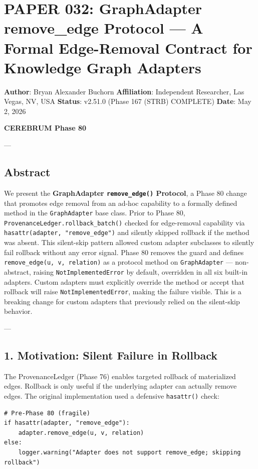 \section{PAPER 032: GraphAdapter remove\_edge Protocol — A Formal Edge-Removal Contract for Knowledge Graph Adapters}

\textbf{Author}: Bryan Alexander Buchorn  
\textbf{Affiliation}: Independent Researcher, Las Vegas, NV, USA  
\textbf{Status}: v2.51.0 (Phase 167 (STRB) COMPLETE)
\textbf{Date}: May 2, 2026

\textbf{CEREBRUM Phase 80}

---

\subsection{Abstract}

We present the \textbf{GraphAdapter \texttt{remove\_edge()} Protocol}, a Phase 80 change that promotes edge removal from an ad-hoc capability to a formally defined method in the \texttt{GraphAdapter} base class. Prior to Phase 80, \texttt{ProvenanceLedger.rollback\_batch()} checked for edge-removal capability via \texttt{hasattr(adapter, "remove\_edge")} and silently skipped rollback if the method was absent. This silent-skip pattern allowed custom adapter subclasses to silently fail rollback without any error signal. Phase 80 removes the guard and defines \texttt{remove\_edge(u, v, relation)} as a protocol method on \texttt{GraphAdapter} — non-abstract, raising \texttt{NotImplementedError} by default, overridden in all six built-in adapters. Custom adapters must explicitly override the method or accept that rollback will raise \texttt{NotImplementedError}, making the failure visible. This is a breaking change for custom adapters that previously relied on the silent-skip behavior.

---

\subsection{1. Motivation: Silent Failure in Rollback}

The ProvenanceLedger (Phase 76) enables targeted rollback of mater\-ialized edges. Rollback is only useful if the underlying adapter can actually remove edges. The original imple\-mentation used a defensive \texttt{hasattr()} check:

\begin{lstlisting}
# Pre-Phase 80 (fragile)
if hasattr(adapter, "remove_edge"):
    adapter.remove_edge(u, v, relation)
else:
    logger.warning("Adapter does not support remove_edge; skipping rollback")
\end{lstlisting}

